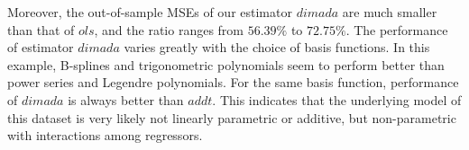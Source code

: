 \documentclass[12pt, a4paper]{article}
\theoremstyle{MAstyle} \newtheorem{assumption}{Assumption}[section]
\theoremstyle{MAstyle} \newtheorem{definition}{Definition}[section]
\theoremstyle{MAstyle} \newtheorem{theorem}{Theorem}[section]
\theoremstyle{MAstyle} \newtheorem{corollary}{Corollary}[section]
\begin{document}
            Moreover, the out-of-sample MSEs of our estimator $dimada$ are much smaller than that of $ols$, and the ratio ranges from $56.39\%$ to $72.75\%$. The performance of estimator $dimada$ varies greatly with the choice of basis functions. In this example, B-splines and trigonometric polynomials seem to perform better than power series and Legendre polynomials. For the same basis function, performance of $dimada$ is always better than $addt$. This indicates that the underlying model of this dataset is very likely not linearly parametric or additive, but non-parametric with interactions among regressors.

            \begin{table}[!htbp] \centering 
                \caption{Out-of-sample MSEs} 
                \label{out-of-sample_MSE} 
\end{table}
\end{document}
